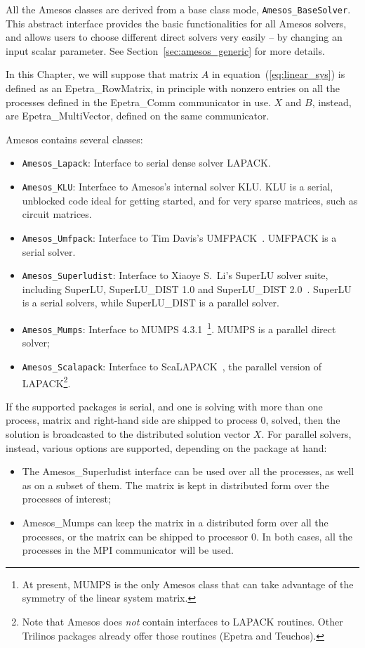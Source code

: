 All the Amesos classes are derived from a base class mode,
\verb!Amesos_BaseSolver!. This abstract interface provides the basic
functionalities for all Amesos solvers, and allows users to choose
different direct solvers very easily -- by changing an input scalar
parameter. See Section~\ref{sec:amesos_generic} for more details.

In this Chapter, we will suppose that matrix $A$ in
equation~(\ref{eq:linear_sys}) is defined as an Epetra\_RowMatrix, in
principle with nonzero entries on all the processes defined in the
Epetra\_Comm communicator in use. $X$ and $B$, instead, are
Epetra\_MultiVector, defined on the same communicator.  

Amesos contains several classes: 
\begin{itemize}
\item \verb!Amesos_Lapack!: Interface to serial dense solver LAPACK.
\item \verb!Amesos_KLU!: Interface to Amesos's internal solver KLU. KLU
  is a serial, unblocked code ideal for getting started, and for very
  sparse matrices, such as circuit matrices. 
\item \verb!Amesos_Umfpack!: Interface to Tim Davis's
  UMFPACK~\cite{umfpack-home-page}. UMFPACK is a serial solver.
\item \verb!Amesos_Superludist!: Interface to Xiaoye S.~Li's SuperLU
  solver suite, including SuperLU, SuperLU\_DIST 1.0 and SuperLU\_DIST
  2.0~\cite{superlu-home-page}. SuperLU is a serial solvers, while
  SuperLU\_DIST is a parallel solver.
\item \verb!Amesos_Mumps!: Interface to MUMPS
  4.3.1~\cite{mumps-home-page}\footnote{At present, MUMPS is the only
    Amesos class that can take advantage of the symmetry of the linear
    system matrix.}. MUMPS is a parallel direct solver;
\item \verb!Amesos_Scalapack!: Interface to ScaLAPACK~\cite{scalapack},
  the parallel version of LAPACK\footnote{Note that Amesos does {\sl
      not} contain interfaces to LAPACK routines.  Other Trilinos
    packages already offer those routines (Epetra and Teuchos).  }.
\end{itemize}

If the supported packages is serial, and one is solving with more than
one process, matrix and right-hand side are shipped to process 0,
solved, then the solution is broadcasted to the distributed solution
vector $X$. For parallel solvers, instead, various options are
supported, depending on the package at hand:
\begin{itemize}
\item The Amesos\_Superludist interface can be used over all the
  processes, as well as on a subset of them. The matrix is kept in
  distributed form over the processes of interest;
\item Amesos\_Mumps can keep the matrix in a distributed form over all
  the processes, or the matrix can be shipped to processor 0. In both
  cases, all the processes in the MPI communicator will be used.
\end{itemize}

